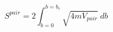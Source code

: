 \begin{equation}
S^{pair} = 2 \int_{b=0}^{b=b_c} \sqrt{4m V_{pair}}~db
\label{SSymNeedle}
\end{equation}

